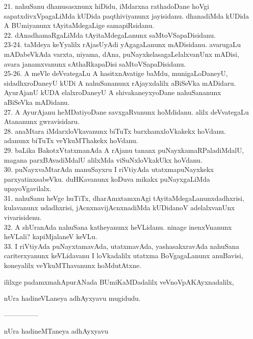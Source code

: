\documentclass{article}
\begin{document}
21. nahuSanu dhanusasxnunx hiDidu, iMdarxna rathadoDane hoVgi sapatxdivxVpagaLiMda kUDida paqthiviyanunx jayisidanu. dhanadiMda kUDida A BUmiyanunx tAyitaMdegaLige samapiRsidanu.\\
22. dAnadhamaRgaLiMda tAyitaMdegaLanunx saMtoVSapaDisidanu.\\
23-24. taMdeya keYyalilx rAjasUyAdi yAgagaLanunx mADisidanu. avarugaLu mADabeVkAda varxta, niyama, dAna, puNayxkelasagaLelalxvanUnx mADisi, avara janamxvanunx sAthaRkapaDisi saMtoVSapaDisidanu.\\
25-26. A meVle deVvategaLu A hasitxnAvatige baMdu, munigaLoDaneyU, sidadhxroDaneyU kUDi A nahuSananunx rAjayxdalilx aBiSeVka mADidaru. AyurAjanU kUDA elalxroDaneyU A shivakaneyxyoDane nahuSananunx aBiSeVka mADidanu.\\
27. A AyurAjanu heMDatiyoDane savxgaRvanunx hoMdidanu. alilx deVvategaLu Atananunx gwravisidaru.\\
28. anaMtara iMdarxloVkavanunx biTuTx barxhamxloVkakekx hoVdanu. adanunx biTuTx veYkuMThakekx hoVdanu.\\
29. baLika BakotxVtatxmanAda A rAjanu tananx puNayxkamaRPaladiMdalU, magana parxBAvadiMdalU alilxMda viSuNxloVkakUkx hoVdanu.\\
30. puNayxvaMtarAda manuSayxru I riVtiyAda utatxmapuNayxkekx parxyatinxsabeVku. duHKavanunx koDuva mikakx puNayxgaLiMda upayoVgavilalx.\\
31. nahuSanu heVge huTiTx, dharAmxtamxnAgi tAyitaMdegaLanunxdadhxrisi, kulavanunx udadhxrisi, jAcnxnavijAcnxnadiMda kUDidanoV adelalxvanUnx vivarisidenu.\\
32. A shUranAda nahuSana katheyanunx heVLidanu. ninage inenxVnanunx heVLali? kapiMjalaneV keVLu.\\
33. I riVtiyAda puNayxtamavAda, utatxmavAda, yashasakxravAda nahuSana cariterxyanunx keVLidavanu I loVkadalilx utatxma BoVgagaLanunx anuBavisi, koneyalilx veYkuMThavanunx hoMdutAtxne.

\begin{center}
ililxge padamxmahApurANada BUmiKaMDadalilx veVnoVpAKAyxnadalilx,
\end{center}

\begin{center}
nUra hadineVLaneya adhAyxyavu mugidudu.
\end{center}

\begin{center}
---------------
\end{center}

\begin{center}
nUra hadineMTaneya adhAyxyavu
\end{center}
\end{document}
